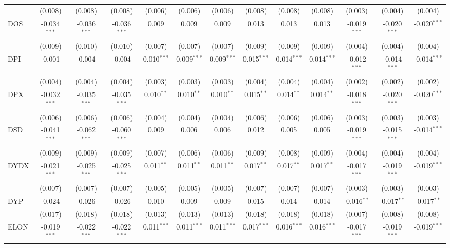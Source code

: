 \begin{table}[!htbp]
\begin{tabular}{@{\extracolsep{5pt}}lcccccccccccc}
  & (0.008) & (0.008) & (0.008) & (0.006) & (0.006) & (0.006) & (0.008) & (0.008) & (0.008) & (0.003) & (0.004) & (0.004) \\
 DOS & -0.034$^{***}$ & -0.036$^{***}$ & -0.036$^{***}$ & 0.009$^{}$ & 0.009$^{}$ & 0.009$^{}$ & 0.013$^{}$ & 0.013$^{}$ & 0.013$^{}$ & -0.019$^{***}$ & -0.020$^{***}$ & -0.020$^{***}$ \\
  & (0.009) & (0.010) & (0.010) & (0.007) & (0.007) & (0.007) & (0.009) & (0.009) & (0.009) & (0.004) & (0.004) & (0.004) \\
 DPI & -0.001$^{}$ & -0.004$^{}$ & -0.004$^{}$ & 0.010$^{***}$ & 0.009$^{***}$ & 0.009$^{***}$ & 0.015$^{***}$ & 0.014$^{***}$ & 0.014$^{***}$ & -0.012$^{***}$ & -0.014$^{***}$ & -0.014$^{***}$ \\
  & (0.004) & (0.004) & (0.004) & (0.003) & (0.003) & (0.003) & (0.004) & (0.004) & (0.004) & (0.002) & (0.002) & (0.002) \\
 DPX & -0.032$^{***}$ & -0.035$^{***}$ & -0.035$^{***}$ & 0.010$^{**}$ & 0.010$^{**}$ & 0.010$^{**}$ & 0.015$^{**}$ & 0.014$^{**}$ & 0.014$^{**}$ & -0.018$^{***}$ & -0.020$^{***}$ & -0.020$^{***}$ \\
  & (0.006) & (0.006) & (0.006) & (0.004) & (0.004) & (0.004) & (0.006) & (0.006) & (0.006) & (0.003) & (0.003) & (0.003) \\
 DSD & -0.041$^{***}$ & -0.062$^{***}$ & -0.060$^{***}$ & 0.009$^{}$ & 0.006$^{}$ & 0.006$^{}$ & 0.012$^{}$ & 0.005$^{}$ & 0.005$^{}$ & -0.019$^{***}$ & -0.015$^{***}$ & -0.014$^{***}$ \\
  & (0.009) & (0.009) & (0.009) & (0.007) & (0.006) & (0.006) & (0.009) & (0.008) & (0.009) & (0.004) & (0.004) & (0.004) \\
 DYDX & -0.021$^{***}$ & -0.025$^{***}$ & -0.025$^{***}$ & 0.011$^{**}$ & 0.011$^{**}$ & 0.011$^{**}$ & 0.017$^{**}$ & 0.017$^{**}$ & 0.017$^{**}$ & -0.017$^{***}$ & -0.019$^{***}$ & -0.019$^{***}$ \\
  & (0.007) & (0.007) & (0.007) & (0.005) & (0.005) & (0.005) & (0.007) & (0.007) & (0.007) & (0.003) & (0.003) & (0.003) \\
 DYP & -0.024$^{}$ & -0.026$^{}$ & -0.026$^{}$ & 0.010$^{}$ & 0.009$^{}$ & 0.009$^{}$ & 0.015$^{}$ & 0.014$^{}$ & 0.014$^{}$ & -0.016$^{**}$ & -0.017$^{**}$ & -0.017$^{**}$ \\
  & (0.017) & (0.018) & (0.018) & (0.013) & (0.013) & (0.013) & (0.018) & (0.018) & (0.018) & (0.007) & (0.008) & (0.008) \\
 ELON & -0.019$^{***}$ & -0.022$^{***}$ & -0.022$^{***}$ & 0.011$^{***}$ & 0.011$^{***}$ & 0.011$^{***}$ & 0.017$^{***}$ & 0.016$^{***}$ & 0.016$^{***}$ & -0.017$^{***}$ & -0.019$^{***}$ & -0.019$^{***}$ \\

\end{tabular}
\end{table}
